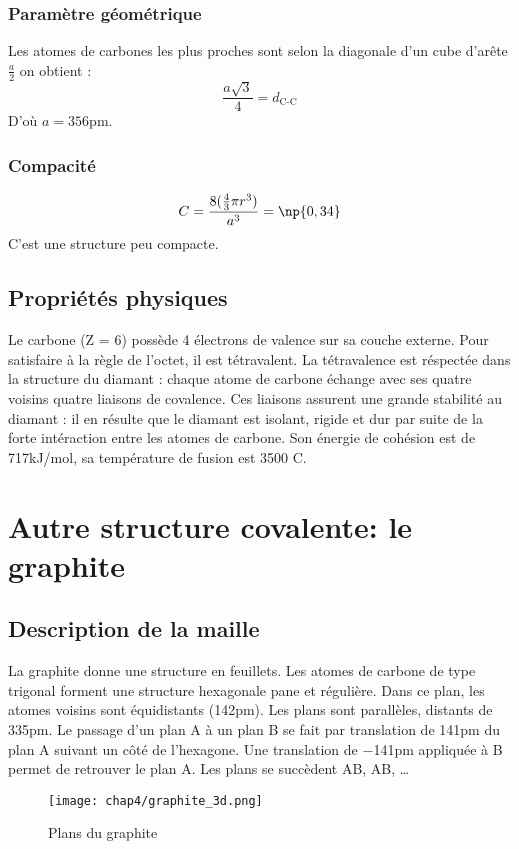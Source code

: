 \subsubsection{Paramètre géométrique}
Les atomes de carbones les plus proches sont selon la diagonale d’un cube d’arête
$\frac{a}{2}$ on obtient :
\begin{equation}
    \frac{a\sqrt{3}}{4} = d_\text{C-C}
\end{equation}
D'où $a = 356$pm.

\subsubsection{Compacité}
\begin{equation}
    C = \frac{8(\frac{4}{3}\pi r^3)}{a^3} = \np{0,34}
\end{equation}
C'est une structure peu compacte.


\subsection{Propriétés physiques}
Le carbone (Z = 6) possède 4 électrons de valence sur sa couche externe. Pour
satisfaire à la règle de l’octet, il est tétravalent. La tétravalence est réspectée dans la structure
du diamant : chaque atome de carbone échange avec ses quatre voisins quatre liaisons
de covalence. Ces liaisons assurent une grande stabilité au diamant : il en résulte que
le diamant est isolant, rigide et dur par suite de la forte intéraction entre les atomes de
carbone.
Son énergie  
de cohésion est de 717kJ/mol, sa température 
de fusion est 3500
\degre C.


\section{Autre structure covalente: le graphite}
\subsection{Description de la maille}
La graphite donne une structure en feuillets. Les atomes de carbone de type trigonal
forment une structure hexagonale pane et régulière. Dans ce plan, les atomes voisins
sont équidistants (142pm). Les plans sont parallèles, distants de 335pm. Le passage
d’un plan A à un plan B se fait par translation de 141pm du plan A suivant un côté de
l’hexagone. Une translation de $-$141pm appliquée à B permet de retrouver le plan A.
Les plans se succèdent AB, AB, \dots
\begin{figure}
    \centering
    \texttt{[image: chap4/graphite\_3d.png]}
    \caption{Plans du graphite}\label{fig:4_graphite_3d}
\end{figure}

